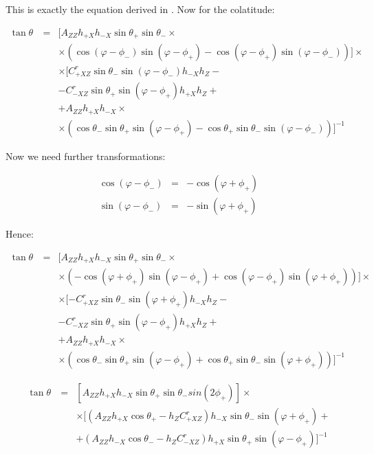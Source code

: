 \documentclass[a4paper,14pt]{extbook}
\begin{document}
This is exactly the equation derived in \cite{cecconi04}. Now for the colatitude:

\begin{eqnarray}\label{tan_theta_cecconi}
\tan \theta\  &=&
[A_{ZZ} h_{+X}h_{-X} \sin \theta_+  \sin \theta_- \times \\
&& \times ( \cos (\varphi - \phi_-)  \sin (\varphi - \phi_+) -\cos (\varphi - \phi_+)  \sin (\varphi - \phi_-))]\times \nonumber \\
&& \times [C_{+XZ}^r \sin \theta_-  \sin (\varphi - \phi_-) h_{-X} h_{Z} - \nonumber \\
&& - C_{-XZ}^r \sin \theta_+  \sin (\varphi - \phi_+) h_{+X} h_{Z} + \nonumber \\
&&+ A_{ZZ} h_{+X} h_{-X} \times \nonumber \\
&&\times (\cos \theta_- \sin \theta_+  \sin (\varphi - \phi_+ )-\cos \theta_+  \sin \theta_-  \sin (\varphi - \phi_-))]^{-1} \nonumber
\end{eqnarray}

Now we need further transformations:

\begin{eqnarray}
 \cos (\varphi - \phi_-) &=& -\cos (\varphi + \phi_+) \\
\sin (\varphi - \phi_-) &=& -\sin (\varphi + \phi_+)
\end{eqnarray}

Hence:

\begin{eqnarray}\label{tan_theta_cecconi}
\tan \theta\  &=&
[A_{ZZ} h_{+X}h_{-X} \sin \theta_+  \sin \theta_- \times \\
&&\times ( -\cos (\varphi + \phi_+)  \sin (\varphi - \phi_+) +\cos (\varphi - \phi_+)  \sin (\varphi + \phi_+))]\times \nonumber \\
&&\times [-C_{+XZ}^r \sin \theta_-  \sin (\varphi + \phi_+) h_{-X} h_{Z} -\nonumber \\
&&-C_{-XZ}^r \sin \theta_+  \sin (\varphi - \phi_+) h_{+X} h_{Z}+ \nonumber \\
&&+ A_{ZZ} h_{+X} h_{-X} \times \nonumber \\
&&\times(\cos \theta_- \sin \theta_+  \sin (\varphi - \phi_+ )+\cos \theta_+  \sin \theta_-  \sin (\varphi + \phi_+))]^{-1} \nonumber
\end{eqnarray}

\begin{eqnarray}\label{tan_theta_cecconi2}
\tan \theta\  &=&
[A_{ZZ} h_{+X}h_{-X} \sin \theta_+  \sin \theta_-  sin(2 \phi_+)] \times \\
&& \times [(A_{ZZ} h_{+X} \cos \theta_+- h_{Z} C_{+XZ}^r) h_{-X} \sin \theta_-  \sin (\varphi + \phi_+)+   \nonumber \\
&&+(A_{ZZ} h_{-X} \cos \theta_- - h_{Z} C_{-XZ}^r) h_{+X} \sin \theta_+  \sin (\varphi - \phi_+) ]^{-1} \nonumber
\end{eqnarray}
\end{document}
